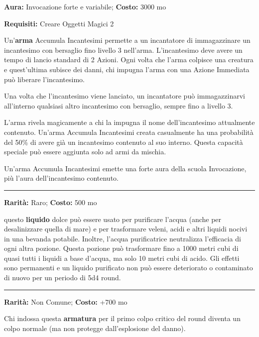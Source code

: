 \begin{multicols}{2}
\textbf{Aura:} Invocazione forte e variabile; \textbf{Costo:} 3000 mo

\textbf{Requisiti:} Creare Oggetti Magici 2

Un'\textbf{arma} Accumula Incantesimi permette a un incantatore di immagazzinare un incantesimo con bersaglio fino livello 3 nell'arma. L'incantesimo deve avere un tempo di lancio standard di 2 Azioni. Ogni volta che l'arma colpisce una creatura e quest'ultima subisce dei danni, chi impugna l'arma con una Azione Immediata può liberare l'incantesimo.

Una volta che l'incantesimo viene lanciato, un incantatore può immagazzinarvi all'interno qualsiasi altro incantesimo con bersaglio, sempre fino a livello 3.

L'arma rivela magicamente a chi la impugna il nome dell'incantesimo attualmente contenuto. Un'arma Accumula Incantesimi creata casualmente ha una probabilità del 50\% di avere già un incantesimo contenuto al suo interno. Questa capacità speciale può essere aggiunta solo ad armi da mischia.

Un'arma Accumula Incantesimi emette una forte aura della scuola Invocazione, più l'aura dell'incantesimo contenuto.

\smallskip\noindent\rule{\linewidth}{2pt}  \hypertarget{Acquapurificatrice}{}\medskip{}\noindent\label{Acquapurificatrice}

\textbf{Rarità:} Raro; \textbf{Costo:} 500 mo

questo \textbf{liquido} dolce può essere usato per purificare l'acqua (anche per desalinizzare quella di mare) e per trasformare veleni, acidi e altri liquidi nocivi in una bevanda potabile. Inoltre, l'acqua purificatrice neutralizza l'efficacia di ogni altra pozione. Questa pozione può trasformare fino a 1000 metri cubi di quasi tutti i liquidi a base d'acqua, ma solo 10 metri cubi di acido. Gli effetti sono permanenti e un liquido purificato non può essere deteriorato o contaminato di nuovo per un periodo di 5d4 round.

\smallskip\noindent\rule{\linewidth}{2pt}  \hypertarget{Adamantio}{}\medskip{}\noindent\label{Adamantio}

\textbf{Rarità:} Non Comune; \textbf{Costo:} +700 mo

Chi indossa questa \textbf{armatura} per il primo colpo critico del round diventa un colpo normale (ma non protegge dall'esplosione del danno).


\end{multicols}
